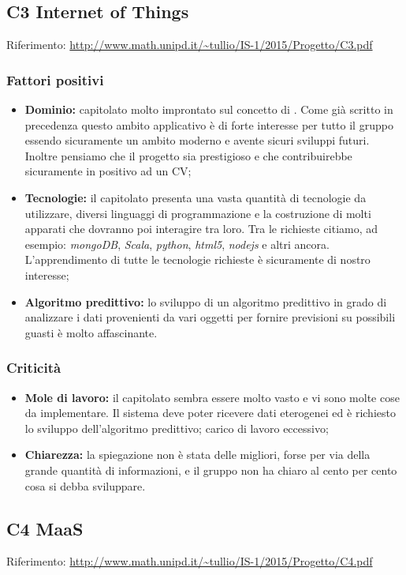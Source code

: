 \documentclass{scalatekids-article}
\begin{document}
\subsection{C3 Internet of Things}
Riferimento: \url{http://www.math.unipd.it/~tullio/IS-1/2015/Progetto/C3.pdf}\\
\subsubsection{Fattori positivi}
\begin{itemize}
\item \textbf{Dominio:} capitolato molto improntato sul concetto di .
Come già scritto in precedenza questo ambito applicativo è di forte interesse per tutto il gruppo essendo sicuramente un ambito moderno e avente sicuri sviluppi futuri. Inoltre pensiamo che il progetto sia prestigioso e che contribuirebbe sicuramente in positivo ad un CV;
\item \textbf{Tecnologie:} il capitolato presenta una vasta quantità di tecnologie da utilizzare, diversi linguaggi di programmazione e la costruzione di molti apparati che dovranno poi interagire tra loro.
Tra le richieste citiamo, ad esempio: \textit{mongoDB}, \textit{Scala}, \textit{python}, \textit{html5}, \textit{nodejs} e altri ancora. L'apprendimento di tutte le tecnologie richieste è sicuramente di nostro interesse;
\item \textbf{Algoritmo predittivo:} lo sviluppo di un algoritmo predittivo in grado di analizzare i dati provenienti da vari oggetti per fornire previsioni su possibili guasti è molto affascinante.
\end{itemize}
\subsubsection{Criticità}
\begin{itemize}
\item \textbf{Mole di lavoro:} il capitolato sembra essere molto vasto e vi sono molte cose da implementare.
Il sistema deve poter ricevere dati eterogenei ed è richiesto lo sviluppo dell'algoritmo predittivo; carico di lavoro eccessivo;
\item \textbf{Chiarezza:} la spiegazione non è stata delle migliori, forse per via della grande quantità di informazioni, e il gruppo non ha chiaro al cento per cento cosa si debba sviluppare.
\end{itemize}

\subsection{C4 MaaS}
Riferimento: \url{http://www.math.unipd.it/~tullio/IS-1/2015/Progetto/C4.pdf}\\
\end{document}
